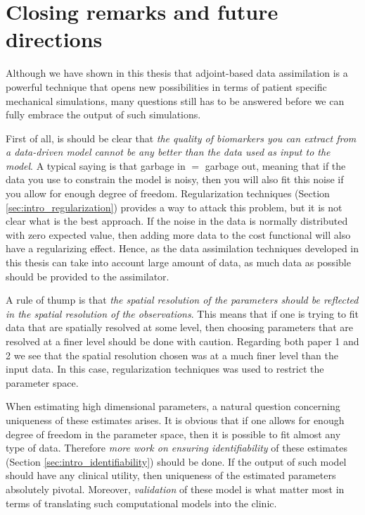 \newpage
\section{Closing remarks and future directions}

Although we have shown in this thesis that
adjoint-based data assimilation is a powerful technique that opens new
possibilities in terms of patient specific mechanical simulations, many questions
still has to be answered before we can fully embrace the output of
such simulations.

First of all, is should be clear that \emph{the
  quality of biomarkers you can extract from a data-driven
  model cannot be any better than the data used as input to the
  model}. A typical saying is that garbage in $=$ garbage out,
meaning that if the data you use to constrain the model is noisy, then
you will also fit this noise if you allow for enough degree of
freedom. Regularization techniques (Section
\ref{sec:intro_regularization}) provides a way to attack this problem,
but it is not clear what is the best approach. If the noise in the
data is normally distributed with zero expected value, then adding
more data to the cost functional will also have a regularizing effect.
Hence, as the data assimilation techniques developed in this thesis
can take into account large amount of data, as much data as possible
should be provided to the assimilator.

A rule of thump is that \emph{the spatial resolution of the parameters should be
  reflected in the spatial resolution of the observations}. This means
that if one is trying to fit data that are spatially resolved at some level,
then choosing parameters that are resolved at a finer level should be
done with caution. Regarding both paper 1 and 2 we see that the
spatial resolution chosen was at a much finer level than the input
data. In this case, regularization techniques was used to restrict the
parameter space. 

When estimating high dimensional parameters, a natural question
concerning uniqueness of these estimates arises. It is obvious that if one allows for
enough degree of freedom in the parameter space, then it is possible
to fit almost any type of data. Therefore \emph{more work on ensuring
identifiability} of these estimates (Section
\ref{sec:intro_identifiability}) should be done. If the output of such
model should have any clinical utility, then uniqueness of the
estimated parameters absolutely pivotal. Moreover, \emph{validation} of
these model is what matter most in terms of translating such computational
models into the clinic.

